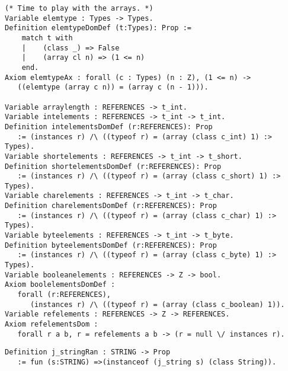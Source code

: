\begin{verbatim}
(* Time to play with the arrays. *)
Variable elemtype : Types -> Types.
Definition elemtypeDomDef (t:Types): Prop :=
    match t with
    |    (class _) => False 
    |    (array cl n) => (1 <= n)
    end.
Axiom elemtypeAx : forall (c : Types) (n : Z), (1 <= n) -> 
   ((elemtype (array c n)) = (array c (n - 1))).

Variable arraylength : REFERENCES -> t_int.
Variable intelements : REFERENCES -> t_int -> t_int.
Definition intelementsDomDef (r:REFERENCES): Prop 
   := (instances r) /\ ((typeof r) = (array (class c_int) 1) :> Types).
Variable shortelements : REFERENCES -> t_int -> t_short.
Definition shortelementsDomDef (r:REFERENCES): Prop 
   := (instances r) /\ ((typeof r) = (array (class c_short) 1) :> Types).
Variable charelements : REFERENCES -> t_int -> t_char.
Definition charelementsDomDef (r:REFERENCES): Prop 
   := (instances r) /\ ((typeof r) = (array (class c_char) 1) :> Types).
Variable byteelements : REFERENCES -> t_int -> t_byte.
Definition byteelementsDomDef (r:REFERENCES): Prop 
   := (instances r) /\ ((typeof r) = (array (class c_byte) 1) :> Types).
Variable booleanelements : REFERENCES -> Z -> bool.
Axiom boolelementsDomDef : 
   forall (r:REFERENCES), 
      (instances r) /\ ((typeof r) = (array (class c_boolean) 1)).
Variable refelements : REFERENCES -> Z -> REFERENCES.
Axiom refelementsDom : 
   forall r a b, r = refelements a b -> (r = null \/ instances r).
\end{verbatim}
\begin{verbatim}
Definition j_stringRan : STRING -> Prop 
   := fun (s:STRING) =>(instanceof (j_string s) (class String)).
\end{verbatim}
